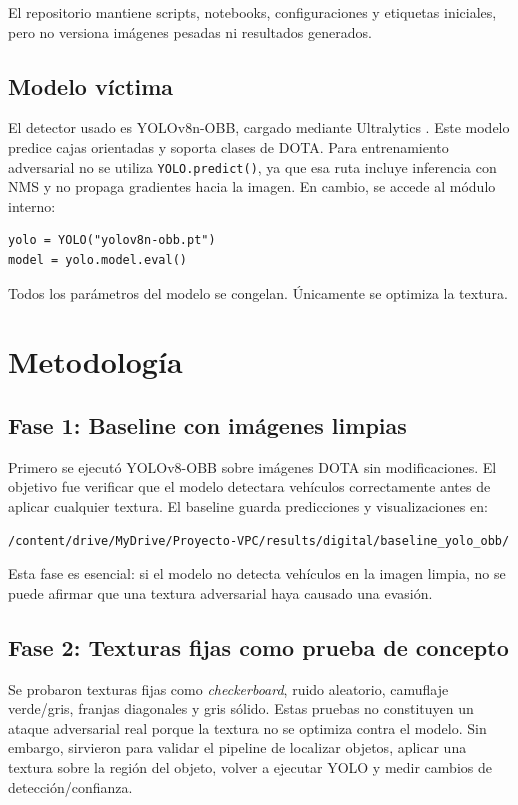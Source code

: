 \documentclass[12pt,a4paper]{article}
\begin{document}
El repositorio mantiene scripts, notebooks, configuraciones y etiquetas iniciales, pero no versiona imágenes pesadas ni resultados generados.

\subsection{Modelo víctima}

El detector usado es YOLOv8n-OBB, cargado mediante Ultralytics \cite{yolov8}. Este modelo predice cajas orientadas y soporta clases de DOTA. Para entrenamiento adversarial no se utiliza \texttt{YOLO.predict()}, ya que esa ruta incluye inferencia con NMS y no propaga gradientes hacia la imagen. En cambio, se accede al módulo interno:

\begin{verbatim}
yolo = YOLO("yolov8n-obb.pt")
model = yolo.model.eval()
\end{verbatim}

Todos los parámetros del modelo se congelan. Únicamente se optimiza la textura.

\section{Metodología}

\subsection{Fase 1: Baseline con imágenes limpias}

Primero se ejecutó YOLOv8-OBB sobre imágenes DOTA sin modificaciones. El objetivo fue verificar que el modelo detectara vehículos correctamente antes de aplicar cualquier textura. El baseline guarda predicciones y visualizaciones en:

\begin{verbatim}
/content/drive/MyDrive/Proyecto-VPC/results/digital/baseline_yolo_obb/
\end{verbatim}

Esta fase es esencial: si el modelo no detecta vehículos en la imagen limpia, no se puede afirmar que una textura adversarial haya causado una evasión.

\subsection{Fase 2: Texturas fijas como prueba de concepto}

Se probaron texturas fijas como \textit{checkerboard}, ruido aleatorio, camuflaje verde/gris, franjas diagonales y gris sólido. Estas pruebas no constituyen un ataque adversarial real porque la textura no se optimiza contra el modelo. Sin embargo, sirvieron para validar el pipeline de localizar objetos, aplicar una textura sobre la región del objeto, volver a ejecutar YOLO y medir cambios de detección/confianza.
\end{document}
